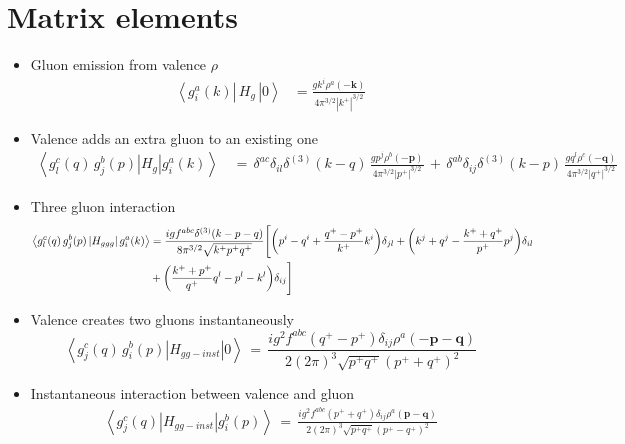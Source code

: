 \documentclass[10pt]{article}
\newcommand{\tikzfig}[1]{\fbox{\small diagram \texttt{\detokenize{#1}} (not included)}}
\def\v#1{\mathbf{#1}}
\numberwithin{equation}{section}
\begin{document}
\newpage 
\section{Matrix elements}


\begin{itemize}
  
  \item   
    Gluon emission from valence $\rho$
    \begin{align}
      \label{m1}
      \left\langle g_{i}^{a}(k)\left|\, H_{g}\,\right|0\right\rangle &=
      \frac{g{k}^{i}\rho^{a}(-\v{k})}{4\pi^{3/2}|k^{+}|^{3/2}} 
    \end{align}
  
  \item Valence adds an extra gluon to an existing one 
    \begin{align}
      \left\langle g_{l}^{c}(q)\, g_{j}^{b}(p)\left|H_{g}\right|g_{i}^{a}(k)\right\rangle &\,=\,    %
      \delta^{ac}\delta_{il}\delta^{(3)}(k-q)\,\frac{g {p}^{j}\rho^{b}(-\mathbf{p})}{4\pi^{3/2}|p^{+}|^{3/2}}
      \,+\,\delta^{ab}\delta_{ij}\delta^{(3)}(k-p)\,\frac{g {q}^{l}\rho^{c}(-\mathbf{q})}{4\pi^{3/2}|q^{+}|^{3/2}}
      \label{m2}
    \end{align}

  \item Three gluon interaction 
    \begin{align}
      \left\langle g_{l}^{c}(q)\, g_{j}^{b}(p)\left|H_{ggg}\right|g_{i}^{a}(k)\right\rangle &  =
      \frac{igf^{abc}\delta^{(3)}(k-p-q)}{8\pi^{3/2}\sqrt{k^{+}p^{+}q^{+}}}
      \Bigg[\bigg({p}^{i}-{q}^{i}+\frac{q^{+}-p^{+}}{k^{+}}{k}^{i}\bigg)\delta_{jl}+\bigg({k}^{j}+{q}^{j}-\frac{k^{+}+q^{+}}{p^{+}}{p}^{j}\bigg)
      \delta_{il}\notag \\ & +\bigg(\frac{k^{+}+p^{+}}{q^{+}}{q}^{l}-{p}^{l}-{k}^{l}\bigg)\delta_{ij}\Bigg]
      \label{m3}
    \end{align}
    \item Valence creates two gluons instantaneously
    \begin{equation}
\left\langle g_{j}^{c}(q)\, g_{i}^{b}(p)\left|H_{gg-inst}\right|0\right\rangle \,=\,\frac{ig^{2}f^{abc}(q^{+}-p^{+})\delta_{ij}\rho^{a}(-\mathbf{p}-\mathbf{q})}{2(2\pi)^{3}\sqrt{p^{+}q^{+}}(p^{+}+q^{+})^{2}}
\label{m4}
 \end{equation}
  \item Instantaneous  interaction between valence and gluon  
    \begin{align}
      \left\langle g_{j}^{c}(q)\left|H_{gg-inst}\right|g_{i}^{b}(p)\right\rangle \,
      =\,  
      \frac{ig^{2}f^{abc}(p^{+}+q^{+})\delta_{ij}\rho^{a}(\mathbf{p}-\mathbf{q})}{2(2\pi)^{3}\sqrt{p^{+}q^{+}}(p^{+}-q^{+})^{2}}
      \label{m5}
    \end{align}
  \end{itemize}
\end{document}

